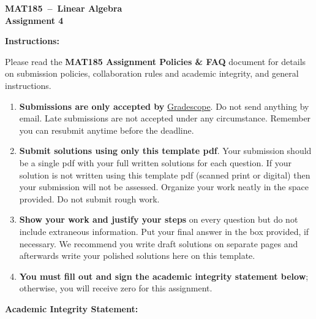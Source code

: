 \documentclass[10pt,answers]{exam}
\newcommand{\course}{MAT185}
\newcommand{\assignmenttitle}{Assignment 4}
\begin{document}
\vspace*{-0.5cm}
\begin{center}
  \large
  \textbf{\Large \course~--~Linear Algebra}\\[0.1cm]
  \textbf{\assignmenttitle}
\end{center}
\bigskip

\textbf{\large Instructions:}\\
\normalsize

Please read the {\bf MAT185 Assignment Policies \& FAQ} document for
details on submission policies, collaboration rules and academic integrity, and
general instructions.

\begin{enumerate}


\item \textbf{Submissions are only accepted by}
  \href{https://www.gradescope.ca}{Gradescope}. Do not send anything by email.
  Late submissions are not accepted under any circumstance. Remember you can
  resubmit anytime before the deadline.

\item \textbf{Submit solutions using only this template pdf}.  Your submission
  should be a single pdf with your full written solutions for each question. If
  your solution is not written using this template pdf (scanned print or
  digital) then your submission will not be assessed. Organize your work neatly
  in the space provided.  Do not submit rough work.

\item \textbf{Show your work and justify your steps} on every question but do
  not include extraneous information.  Put your final answer in the box
  provided, if necessary.  We recommend you write draft solutions on separate
  pages and afterwards write your polished solutions here on this template.

\item \textbf{You must fill out and sign the academic integrity statement
    below}; otherwise, you will receive zero for this assignment.

\end{enumerate}

\vspace{10pt}

\textbf{\large Academic Integrity Statement:} \\


\vspace*{0.1in}
\end{document}
